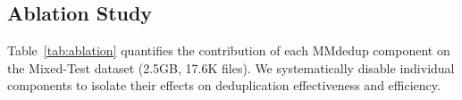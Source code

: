 \documentclass[conference]{IEEEtran}
\renewcommand{\arraystretch}{1.15}
\begin{document}

\subsection{Ablation Study}

Table~\ref{tab:ablation} quantifies the contribution of each MMdedup component on the Mixed-Test dataset (2.5GB, 17.6K files). We systematically disable individual components to isolate their effects on deduplication effectiveness and efficiency.
\end{document}
